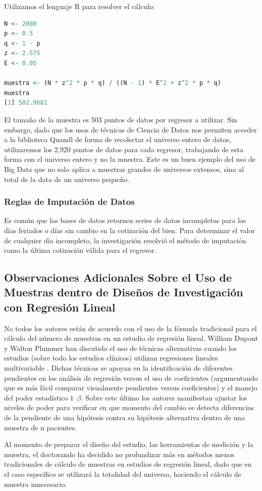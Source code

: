 Utilizamos el lenguaje R para resolver el cálculo:

\begin{lstlisting}[language=R]
N <- 2080
p <- 0.5
q <- 1 - p
z <- 2.575
E <- 0.05

muestra <- (N * z^2 * p * q) / ((N - 1) * E^2 + z^2 * p * q)
muestra
[1] 502.9681
\end{lstlisting}

El tamaño de la muestra es 503 puntos de datos por regresor a utilizar. Sin embargo, dado que los usos de técnicas de Ciencia de Datos nos permiten acceder a la biblioteca Quandl de forma de recolectar el universo entero de datos, utilizaremos los 2,920 puntos de datos para cada regresor, trabajando de esta forma con el universo entero y no la muestra. Este es un buen ejemplo del uso de Big Data \cite{pengMatsui} que no solo aplica a muestras grandes de universos extensos, sino al total de la data de un universo pequeño.

\subsubsection{Reglas de Imputación de Datos}
Es común que las bases de datos retornen series de datos incompletas para los días feriados o días sin cambio en la cotización del bien. Para determinar el valor de cualquier día incompleto, la investigación resolvió el método de imputación como la última cotización válida para el regresor.

\subsection{Observaciones Adicionales Sobre el Uso de Muestras dentro de Diseños de Investigación con Regresión Lineal}
No todos los autores están de acuerdo con el uso de la fórmula tradicional para el cálculo del número de muestras en un estudio de regresión lineal. William Dupont y Walton Plummer han discutido el uso de técnicas alternativas cuando los estudios (sobre todo los estudios clínicos) utilizan regresiones lineales multivariable \cite{dupontPlummer}. Dichas técnicas se apoyan en la identificación de diferentes pendientes en los análisis de regresión versus el uso de coeficientes (argumentando que es más fácil comparar visualmente pendientes versus coeficientes) y el manejo del poder estadístico $1 – \beta$. Sobre este último los autores manifiestan ajustar los niveles de poder para verificar en que momento del cambio se detecta diferencias de la pendiente de una hipótesis contra su hipótesis alternativa dentro de una muestra de n pacientes.

Al momento de preparar el diseño del estudio, las herramientas de medición y la muestra, el doctorando ha decidido no profundizar más en métodos menos tradicionales de cálculo de muestras en estudios de regresión lineal, dado que en el caso específico se utilizará la totalidad del universo, haciendo el cálculo de muestra innecesario.

